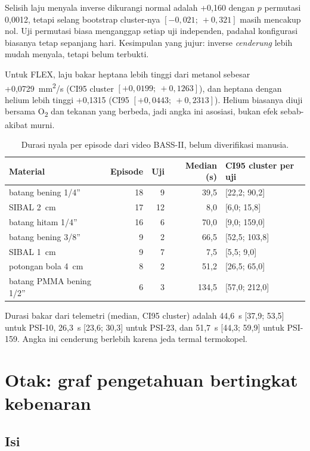 \documentclass[11pt,a4paper]{report}
\newcommand{\Od}{O\textsubscript{2}}
\begin{document}
Selisih laju menyala inverse dikurangi normal adalah +0,160 dengan $p$ permutasi 0,0012, tetapi
selang bootstrap cluster-nya $[-0{,}021;\ +0{,}321]$ masih mencakup nol. Uji permutasi biasa
menganggap setiap uji independen, padahal konfigurasi biasanya tetap sepanjang hari. Kesimpulan
yang jujur: inverse \emph{cenderung} lebih mudah menyala, tetapi belum terbukti.

Untuk FLEX, laju bakar heptana lebih tinggi dari metanol sebesar +0,0729~mm\textsuperscript{2}/s
(CI95 cluster $[+0{,}0199;\ +0{,}1263]$), dan heptana dengan helium lebih tinggi +0,1315
(CI95 $[+0{,}0443;\ +0{,}2313]$). Helium biasanya diuji bersama \Od{} dan tekanan yang berbeda,
jadi angka ini asosiasi, bukan efek sebab-akibat murni.

\begin{table}[ht]
\centering\small
\caption{Durasi nyala per episode dari video BASS-II, belum diverifikasi manusia.}
\label{tab:uq-video}
\begin{tabular}{@{}l r r r l@{}}
\toprule
Material & Episode & Uji & Median (s) & CI95 cluster per uji\\
\midrule
batang bening 1/4'' & 18 & 9 & 39,5 & [22,2; 90,2]\\
SIBAL 2~cm & 17 & 12 & 8,0 & [6,0; 15,8]\\
batang hitam 1/4'' & 16 & 6 & 70,0 & [9,0; 159,0]\\
batang bening 3/8'' & 9 & 2 & 66,5 & [52,5; 103,8]\\
SIBAL 1~cm & 9 & 7 & 7,5 & [5,5; 9,0]\\
potongan bola 4~cm & 8 & 2 & 51,2 & [26,5; 65,0]\\
batang PMMA bening 1/2'' & 6 & 3 & 134,5 & [57,0; 212,0]\\
\bottomrule
\end{tabular}
\end{table}

Durasi bakar dari telemetri (median, CI95 cluster) adalah 44,6~s [37,9; 53,5] untuk PSI-10,
26,3~s [23,6; 30,3] untuk PSI-23, dan 51,7~s [44,3; 59,9] untuk PSI-159. Angka ini cenderung
berlebih karena jeda termal termokopel.

\chapter{Otak: graf pengetahuan bertingkat kebenaran}\label{bab:otak}

\section{Isi}
\end{document}
